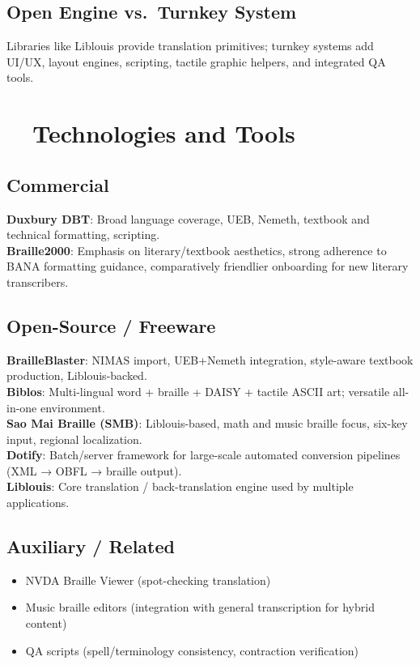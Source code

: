 \subsection*{Open Engine vs.\ Turnkey System}
Libraries like Liblouis provide translation primitives; turnkey systems add UI/UX, layout engines, scripting, tactile graphic helpers, and integrated QA tools.

\section{~~Technologies and Tools}
\label{sec:braille-tools}
\subsection*{Commercial}
\textbf{Duxbury DBT}\supercite{Duxbury}: Broad language coverage, UEB, Nemeth, textbook and technical formatting, scripting. \\
\textbf{Braille2000}\supercite{Braille2000}: Emphasis on literary/textbook aesthetics, strong adherence to BANA formatting guidance, comparatively friendlier onboarding for new literary transcribers.

\subsection*{Open-Source / Freeware}
\textbf{BrailleBlaster}\supercite{BrailleBlaster}: NIMAS import, UEB+Nemeth integration, style-aware textbook production, Liblouis-backed. \\
\textbf{Biblos}\supercite{Biblos}: Multi-lingual word  + braille + DAISY + tactile ASCII art; versatile all-in-one environment. \\
\textbf{Sao Mai Braille (SMB)}\supercite{SMB}: Liblouis-based, math and music braille focus, six-key input, regional localization. \\
\textbf{Dotify}\supercite{Dotify}: Batch/server framework for large-scale automated conversion pipelines (XML → OBFL → braille output). \\
\textbf{Liblouis}\supercite{Liblouis}: Core translation / back-translation engine used by multiple applications.

\subsection*{Auxiliary / Related}
\begin{itemize}
	\item NVDA Braille Viewer (spot-checking translation)
	\item Music braille editors (integration with general transcription for hybrid content)
	\item QA scripts (spell/terminology consistency, contraction verification)
\end{itemize}

